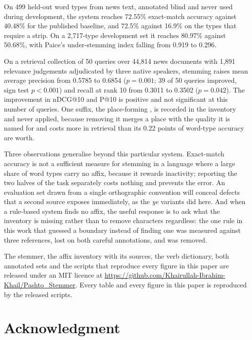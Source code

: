 \documentclass[conference]{IEEEtran}
\newcommand{\ps}[1]{{\pashtofont\textpashto{#1}}}
\begin{document}
On 499 held-out word types from news text, annotated blind and never used
during development, the system reaches 72.55\% exact-match accuracy against
40.48\% for the published baseline, and 72.5\% against 16.9\% on the types
that require a strip. On a 2{,}717-type development set it reaches 80.97\%
against 50.68\%, with Paice's under-stemming index falling from 0.919 to
0.296.

On a retrieval collection of 50 queries over 44{,}814 news documents with 1{,}891
relevance judgements adjudicated by three native speakers, stemming raises mean
average precision from 0.5785 to 0.6854 ($p = 0.001$; 39 of 50 queries improved,
sign test $p < 0.001$) and recall at rank 10 from 0.3011 to 0.3502
($p = 0.042$). The improvement in nDCG@10 and P@10 is positive and not
significant at this number of queries. One suffix, the place-forming \ps{تون}, is recorded
in the inventory and never applied, because removing it merges a place with
the quality it is named for and costs more in retrieval than its 0.22 points
of word-type accuracy are worth.

Three observations generalise beyond this particular system. Exact-match
accuracy is not a sufficient measure for stemming in a language where a large
share of word types carry no affix, because it rewards inactivity; reporting
the two halves of the task separately costs nothing and prevents the error. An
evaluation set drawn from a single orthographic convention will conceal defects
that a second source exposes immediately, as the \emph{ye} variants did here.
And when a rule-based system finds no affix, the useful response is to ask what
the inventory is missing rather than to remove characters regardless: the one
rule in this work that guessed a boundary instead of finding one was measured
against three references, lost on both careful annotations, and was removed.

The stemmer, the affix inventory with its sources, the verb dictionary, both
annotated sets and the scripts that reproduce every figure in this paper are
released under an MIT licence at
\url{https://github.com/Khairullah-Ibrahim-Khail/Pashto_Stemmer}. Every table
and every figure in this paper is reproduced by the released scripts.

\section*{Acknowledgment}
\end{document}
